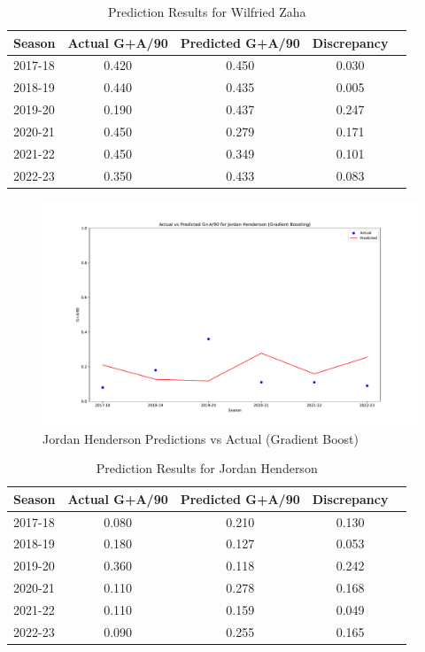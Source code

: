 \documentclass[12pt]{article}
\begin{document}
\begin{table}[H]
  \centering
  \begin{tabular}{|l|c|c|c|c|}
  \hline
  \textbf{Season} & \textbf{Actual G+A/90} & \textbf{Predicted G+A/90} & \textbf{Discrepancy} \\
  \hline
  2017-18 & 0.420 & 0.450 & 0.030 \\
  2018-19 & 0.440 & 0.435 & 0.005 \\
  2019-20 & 0.190 & 0.437 & 0.247 \\
  2020-21 & 0.450 & 0.279 & 0.171 \\
  2021-22 & 0.450 & 0.349 & 0.101 \\
  2022-23 & 0.350 & 0.433 & 0.083 \\
  \hline
  \end{tabular}
  \caption{Prediction Results for Wilfried Zaha}
  \label{tab:zaha_prediction_results}
  \end{table}
  

\begin{figure}[H]
  \centering
  \includegraphics[width=1\textwidth]{GradBoost_Henderson.pdf}
  \caption{Jordan Henderson Predictions vs Actual (Gradient Boost)}
  \label{fig:Henderson_graph}
  \end{figure}


\begin{table}[H]
  \centering
  \begin{tabular}{|l|c|c|c|c|}
  \hline
  \textbf{Season} & \textbf{Actual G+A/90} & \textbf{Predicted G+A/90} & \textbf{Discrepancy} \\
  \hline
  2017-18 & 0.080 & 0.210 & 0.130 \\
  2018-19 & 0.180 & 0.127 & 0.053 \\
  2019-20 & 0.360 & 0.118 & 0.242 \\
  2020-21 & 0.110 & 0.278 & 0.168 \\
  2021-22 & 0.110 & 0.159 & 0.049 \\
  2022-23 & 0.090 & 0.255 & 0.165 \\
  \hline
  \end{tabular}
  \caption{Prediction Results for Jordan Henderson}
  \label{tab:henderson_prediction_results}
\end{table}
\end{document}
